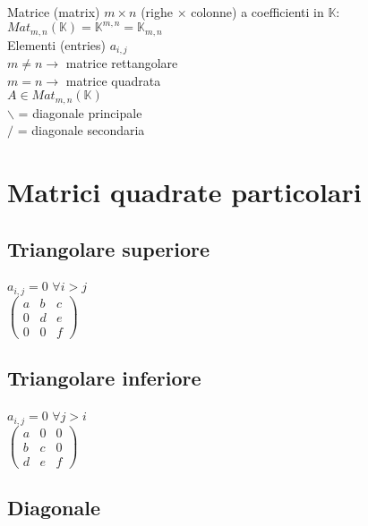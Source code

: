 \documentclass[a4paper, twoside, italian, 11pt]{book}
\newcommand{\K}{\mathbb K}
\begin{document}
Matrice (matrix) $m \times n$ (righe $\times$ colonne) a coefficienti in $\K$: \\
$Mat_{m,n}(\K) = \K^{m,n} = \K_{m,n}$ \\

\noindent
Elementi (entries) $a_{i, j}$ \\

\noindent
$m \neq n \rightarrow$ matrice rettangolare \\
$m = n \rightarrow$ matrice quadrata \\

\noindent
$A \in Mat_{m,n}(\K)$ \\

\noindent
$\backslash$ = diagonale principale \\
$/$ = diagonale secondaria \\



\section{Matrici quadrate particolari}


\subsection{Triangolare superiore}

$a_{i,j} = 0$ $\forall i > j$ \\

\noindent
$\begin{pmatrix}
a & b & c \\
0 & d & e \\
0 & 0 & f
\end{pmatrix}$


\subsection{Triangolare inferiore}

$a_{i,j} = 0$ $\forall j > i$ \\

\noindent
$\begin{pmatrix}
a & 0 & 0 \\
b & c & 0 \\
d & e & f
\end{pmatrix}$


\subsection{Diagonale}
\end{document}
